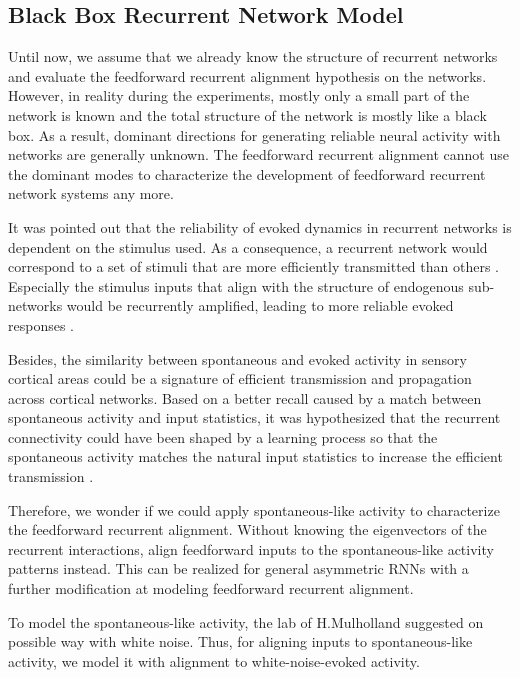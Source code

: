 \documentclass[11pt]{article}
\begin{document}
	\clearpage
	\subsection{Black Box Recurrent Network Model} \label{sec:black_box_method}
	Until now, we assume that we already know the structure of recurrent networks and evaluate the feedforward recurrent alignment hypothesis on the networks. However, in reality during the experiments, mostly only a small part of the network is known and the total structure of the network is mostly like a black box. As a result, dominant directions for generating reliable neural activity with networks are generally unknown. The feedforward recurrent alignment cannot use the dominant modes to characterize the development of feedforward recurrent network systems any more. 
	
	It was pointed out that the reliability of evoked dynamics in recurrent networks is dependent on the stimulus used. As a consequence, a recurrent network would correspond to a set of stimuli that are more efficiently transmitted than others \cite{marre2009reliable}. 
	Especially the stimulus inputs that align with the structure of endogenous sub-networks would be recurrently amplified, leading to more reliable evoked responses \cite{mulholland2023selective}. 
	
	Besides, the similarity between spontaneous and evoked activity in sensory cortical areas could be a signature of efficient transmission and propagation across cortical networks. Based on a better recall caused by a match between spontaneous activity and input statistics, it was hypothesized that the recurrent connectivity could have been shaped by a learning process so that the spontaneous activity matches the natural input statistics to increase the efficient transmission \cite{marre2009reliable}. 
	
	Therefore, we wonder if we could apply spontaneous-like activity to characterize the feedforward recurrent alignment. Without knowing the eigenvectors of the recurrent interactions, align feedforward inputs to the spontaneous-like activity patterns instead. This can be realized for general asymmetric RNNs with a further modification at modeling feedforward recurrent alignment. 
	
	To model the spontaneous-like activity, the lab of H.Mulholland \cite{cosyne2023} suggested on possible way with white noise. Thus, for aligning inputs to spontaneous-like activity, we model it with alignment to white-noise-evoked activity.  
	
\end{document}
